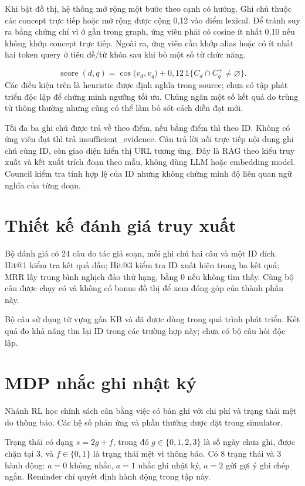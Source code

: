 Khi bật đồ thị, hệ thống mở rộng một bước theo cạnh có hướng. Ghi chú thuộc các concept trực tiếp hoặc mở rộng được cộng 0,12 vào điểm lexical. Để tránh suy ra bằng chứng chỉ vì ở gần trong graph, ứng viên phải có cosine ít nhất 0,10 nếu không khớp concept trực tiếp. Ngoài ra, ứng viên cần khớp alias hoặc có ít nhất hai token query ở tiêu đề/từ khóa sau khi bỏ một số từ chức năng.

\begin{equation}
\operatorname{score}(d,q)=\cos\bigl(v_d,v_q\bigr)+0,12\,\mathbb{1}\{C_d\cap C_q^{+}\ne\varnothing\}.
\end{equation}
Các điều kiện trên là heuristic được định nghĩa trong source; chưa có tập phát triển độc lập để chứng minh ngưỡng tối ưu. Chúng ngăn một số kết quả do trùng từ thông thường nhưng cũng có thể làm bỏ sót cách diễn đạt mới.

Tối đa ba ghi chú được trả về theo điểm, nếu bằng điểm thì theo ID. Không có ứng viên đạt thì trả insufficient\_evidence. Câu trả lời nối trực tiếp nội dung ghi chú cùng ID, còn giao diện hiển thị URL tương ứng. Đây là RAG theo kiểu truy xuất và kết xuất trích đoạn theo mẫu, không dùng LLM hoặc embedding model. Council kiểm tra tính hợp lệ của ID nhưng không chứng minh độ liên quan ngữ nghĩa của từng đoạn.

\section{Thiết kế đánh giá truy xuất}
Bộ đánh giá có 24 câu do tác giả soạn, mỗi ghi chú hai câu và một ID đích. Hit@1 kiểm tra kết quả đầu; Hit@3 kiểm tra ID xuất hiện trong ba kết quả; MRR lấy trung bình nghịch đảo thứ hạng, bằng 0 nếu không tìm thấy. Cùng bộ câu được chạy có và không có bonus đồ thị để xem đóng góp của thành phần này.

Bộ câu sử dụng từ vựng gần KB và đã được dùng trong quá trình phát triển. Kết quả đo khả năng tìm lại ID trong các trường hợp này; chưa có bộ câu hỏi độc lập.

\section{MDP nhắc ghi nhật ký}
Nhánh RL học chính sách cân bằng việc có bản ghi với chi phí và trạng thái mệt do thông báo. Các hệ số phản ứng và phần thưởng được đặt trong simulator.

Trạng thái có dạng $s=2g+f$, trong đó $g\in\{0,1,2,3\}$ là số ngày chưa ghi, được chặn tại 3, và $f\in\{0,1\}$ là trạng thái mệt vì thông báo. Có 8 trạng thái và 3 hành động: $a=0$ không nhắc, $a=1$ nhắc ghi nhật ký, $a=2$ gửi gợi ý ghi chép ngắn. Reminder chỉ quyết định hành động trong tập này.

